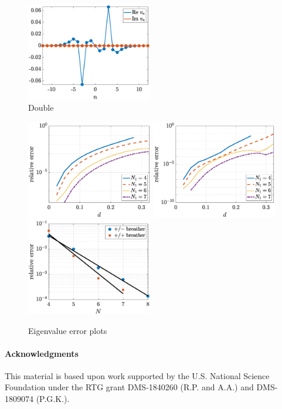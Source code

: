 \documentclass[12pt,reqno]{amsart}
\begin{document}
\begin{figure}
\begin{center}
	\includegraphics[width=5.5cm]{doubleppinteig.eps} 
	\end{center}
	\caption{Double}
	\label{fig:double}
\end{figure}

\begin{figure}
	\begin{center}
	\includegraphics[width=5.5cm]{doubleeigerrord.eps} \hspace{-0.5cm}
	\includegraphics[width=5.5cm]{doubleppeigerrord.eps} \hspace{-0.5cm}
	\includegraphics[width=5.5cm]{doubleeigerrorN.eps} 
	\end{center}
	\caption{Eigenvalue error plots}
	\label{fig:eigerror}
\end{figure}



\paragraph{Acknowledgments}

This material is based upon work supported by the U.S. National Science Foundation under the RTG grant DMS-1840260 (R.P. and A.A.)
and DMS-1809074 (P.G.K.).



\end{document}
